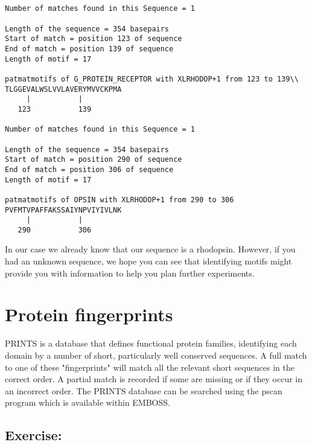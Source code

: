 \documentclass[12pt]{report}
\begin{document}
\unix{}\\
\\
\\
\\

\unix{}
\begin{verbatim}
Number of matches found	in this	Sequence = 1

Length of the sequence = 354 basepairs
Start of match = position 123 of sequence
End of match = position	139 of sequence
Length of motif	= 17

patmatmotifs of	G_PROTEIN_RECEPTOR with	XLRHODOP+1 from	123 to 139\\
TLGGEVALWSLVVLAVERYMVVCKPMA
     |		     |
   123		     139

Number of matches found	in this	Sequence = 1

Length of the sequence = 354 basepairs
Start of match = position 290 of sequence
End of match = position	306 of sequence
Length of motif	= 17

patmatmotifs of	OPSIN with XLRHODOP+1 from 290 to 306
PVFMTVPAFFAKSSAIYNPVIYIVLNK
     |		     |
   290		     306
\end{verbatim}

In our case we already know that our sequence is a rhodopsin. However,
if you had an unknown sequence,	we hope	you can	see that identifying
motifs might provide you with information to help you plan further
experiments.

\section{Protein fingerprints}
PRINTS is a database that defines functional protein families,
identifying each domain	by a number of short, particularly well
conserved sequences. A full match to one of these "fingerprints" will
match all the relevant short sequences in the correct order. A partial
match is recorded if some are missing or if they occur in an incorrect
order. The PRINTS database can be searched using the pscan program
which is available within EMBOSS.

\subsection*{Exercise: }
\end{document}
